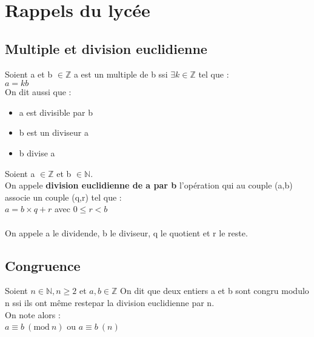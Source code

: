 \chapter{Rappels du lyc\'ee}
\section{Multiple et division euclidienne}
\begin{madef}
Soient a et b $\in \mathbb{Z} $
\newline
a est un multiple de b ssi $\exists k \in \mathbb{Z}$ tel que : \\
$a = kb $
\\ On dit aussi que  :
\begin{itemize}[label=, font=\color{black}]
	\item a est divisible par b 
	\item b est un diviseur a
	\item b divise a
\end{itemize}
\end{madef}


\begin{madef}
Soient a $\in \mathbb{Z}$ et b $\in \mathbb{N}$. \\
On appele \textbf{division euclidienne de a par b} l'op\'eration qui au couple (a,b) associe un couple (q,r) tel que : \\
$a = b \times q + r$ avec $0 \le r < b$ \\
\\
On appele a le dividende, b le diviseur, q le quotient et r le reste. 
\end{madef}


\section{Congruence}
\begin{madef}
Soient $n \in \mathbb{N}, n \ge 2$ et $a, b \in \mathbb{Z}$ 
On dit que deux entiers a et b sont congru modulo n ssi ils ont m\^eme restepar la division euclidienne par n. \\
On note alors : \\
$a \equiv b\ (\textrm{mod}\ n)$ ou $a \equiv b\ (n)$

\end{madef}

